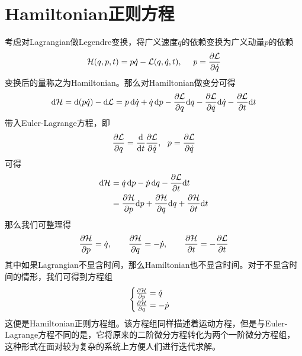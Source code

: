 \section{Hamiltonian正则方程}
\label{sec:cannoical_eqs}
考虑对Lagrangian做Legendre变换，将广义速度$\dot q$的依赖变换为广义动量$p$的依赖
\begin{equation}
    \mathcal{H}(q,p,t) = p\dot q - \mathcal{L}(q,\dot q, t),~~~~p = \frac{\partial\mathcal{L}}{\partial\dot q}
\end{equation}
变换后的量称之为Hamiltonian。那么对Hamiltonian做变分可得
\begin{equation}\begin{split}
     \mathrm{d} \mathcal{H} = \mathrm{d}(p\dot q) - \mathrm{d} \mathcal{L}=p\,\mathrm{d}\dot q + \dot q\, \mathrm{d} p-\frac{\partial\mathcal{L}}{\partial q}\mathrm{d} q -\frac{\partial\mathcal{L}}{\partial\dot q}\mathrm{d} \dot q - \frac{\partial\mathcal{L}}{\partial t}\mathrm{d} t\\
\end{split}
\end{equation}
带入Euler-Lagrange方程，即
\begin{equation}
    \frac{\partial\mathcal{L}}{\partial q} = \frac{\mathrm{d}}{\mathrm{d} t}\frac{\partial\mathcal{L}}{\partial\dot q},~~p = \frac{\partial\mathcal{L}}{\partial\dot q}
\end{equation}
可得
\begin{equation}
    \begin{split}
       \mathrm{d}\mathcal{H} & = \dot q 
       \,\mathrm{d} p - \dot p \,\mathrm{d} q-\frac{\partial\mathcal{L}}{\partial t}\mathrm{d} t\\&=\frac{\partial\mathcal{H}}{\partial p}\mathrm{d} p +  \frac{\partial\mathcal{H}}{\partial q}\mathrm{d} q + \frac{\partial\mathcal{H}}{\partial t}\mathrm{d} t
    \end{split}
\end{equation}
那么我们可整理得
\begin{equation}
    \frac{\partial\mathcal{H}}{\partial p} = \dot{q},\qquad\frac{\partial \mathcal{H}}{\partial q} = -\dot{p},\qquad \frac{\partial\mathcal{H}}{\partial t} = -\frac{\partial\mathcal{L}}{\partial t}
\end{equation}
其中如果Lagrangian不显含时间，那么Hamiltonian也不显含时间。对于不显含时间的情形，我们可得到方程组
\begin{equation}
    \begin{cases}
        \frac{\partial\mathcal{H}}{\partial p} = \dot{q}\\
        \frac{\partial \mathcal{H}}{\partial q} = -\dot{p}
    \end{cases}
\end{equation}
这便是Hamiltonian正则方程组。该方程组同样描述着运动方程，但是与Euler-Lagrange方程不同的是，它将原来的二阶微分方程转化为两个一阶微分方程组，这种形式在面对较为复杂的系统上方便人们进行迭代求解。

